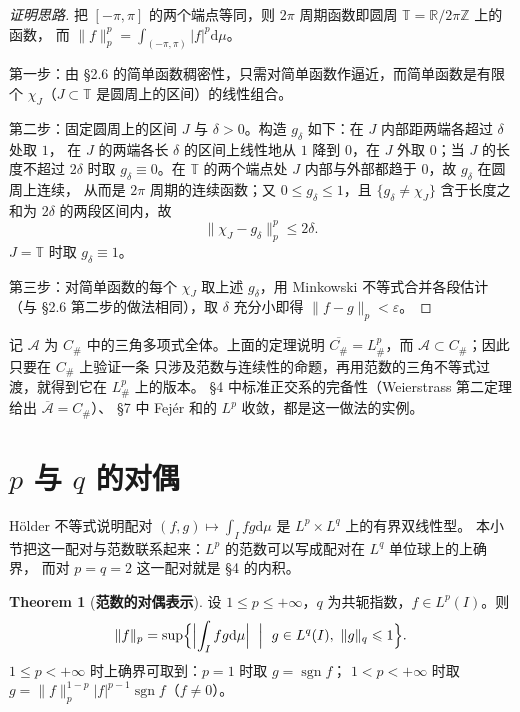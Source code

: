 \documentclass[oneside]{book}
\theoremstyle{definition}
\newcommand{\R}{\mathbb{R}}
\newcommand{\Z}{\mathbb{Z}}
\newcommand{\dd}{\mathrm{d}}
\DeclareMathOperator{\sgn}{sgn}
\theoremstyle{definition}
\newtheorem{theorem}{Theorem}[section]
\begin{document}
	\begin{proof}[证明思路]
		把 $[-\pi,\pi]$ 的两个端点等同，则 $2\pi$ 周期函数即圆周 $\mathbb T=\R/2\pi\Z$ 上的函数，
		而 $\|f\|_p^p=\int_{(-\pi,\pi)}|f|^p\dd\mu$。
		
		第一步：由 §2.6 的简单函数稠密性，只需对简单函数作逼近，而简单函数是有限个
		$\chi_J$（$J\subset\mathbb T$ 是圆周上的区间）的线性组合。
		
		第二步：固定圆周上的区间 $J$ 与 $\delta>0$。构造 $g_\delta$ 如下：在 $J$ 内部距两端各超过 $\delta$ 处取 $1$，
		在 $J$ 的两端各长 $\delta$ 的区间上线性地从 $1$ 降到 $0$，在 $J$ 外取 $0$；当 $J$ 的长度不超过 $2\delta$ 时取
		$g_\delta\equiv0$。在 $\mathbb T$ 的两个端点处 $J$ 内部与外部都趋于 $0$，故 $g_\delta$ 在圆周上连续，
		从而是 $2\pi$ 周期的连续函数；又 $0\leqslant g_\delta\leqslant1$，且 $\{g_\delta\ne\chi_J\}$ 含于长度之和为 $2\delta$
		的两段区间内，故
		\[
		\|\chi_J-g_\delta\|_p^p\leqslant2\delta .
		\]
		$J=\mathbb T$ 时取 $g_\delta\equiv1$。
		
		第三步：对简单函数的每个 $\chi_J$ 取上述 $g_\delta$，用 Minkowski 不等式合并各段估计
		（与 §2.6 第二步的做法相同），取 $\delta$ 充分小即得 $\|f-g\|_p<\varepsilon$。
	\end{proof}
	
	\begin{note}
		记 $\mathcal A$ 为 $C_\#$ 中的三角多项式全体。上面的定理说明
		$\overline{C_\#}=L^p_\#$，而 $\mathcal A\subset C_\#$；因此只要在 $C_\#$ 上验证一条
		只涉及范数与连续性的命题，再用范数的三角不等式过渡，就得到它在 $L^p_\#$ 上的版本。
		§4 中标准正交系的完备性（Weierstrass 第二定理给出 $\overline{\mathcal A}=C_\#$）、
		§7 中 Fejér 和的 $L^p$ 收敛，都是这一做法的实例。
	\end{note}
	
	\section{$p$ 与 $q$ 的对偶}
	
	Hölder 不等式说明配对 $(f,g)\mapsto\int_I fg\dd\mu$ 是 $L^p\times L^q$ 上的有界双线性型。
	本小节把这一配对与范数联系起来：$L^p$ 的范数可以写成配对在 $L^q$ 单位球上的上确界，
	而对 $p=q=2$ 这一配对就是 §4 的内积。
	
	\begin{theorem}[\bfseries{范数的对偶表示}]
		设 $1\leqslant p\leqslant+\infty$，$q$ 为共轭指数，$f\in L^p(I)$。则
		\[
		\|f\|_p=\sup\Bigl\{\Bigl|\int_I f g\dd\mu\Bigr|\ \Bigm|\ g\in L^q(I),\ \|g\|_q\leqslant1\Bigr\}.
		\]
		$1\leqslant p<+\infty$ 时上确界可取到：$p=1$ 时取 $g=\sgn f$；
		$1<p<+\infty$ 时取 $g=\|f\|_p^{1-p}|f|^{p-1}\sgn f$（$f\ne0$）。
	\end{theorem}
	
\end{document}

